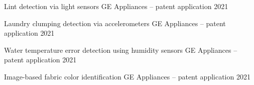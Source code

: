 

\begin{cvhonors}

  \cvhonor
    {Lint detection via light sensors} %
    {GE Appliances -- patent application} %
    {} %
    {2021} %

  \cvhonor
    {Laundry clumping detection via accelerometers} %
    {GE Appliances -- patent application} %
    {} %
    {2021} %

  \cvhonor
    {Water temperature error detection using humidity sensors} %
    {GE Appliances -- patent application} %
    {} %
    {2021} %

  \cvhonor
    {Image-based fabric color identification} %
    {GE Appliances -- patent application} %
    {} %
    {2021} %

\end{cvhonors}
